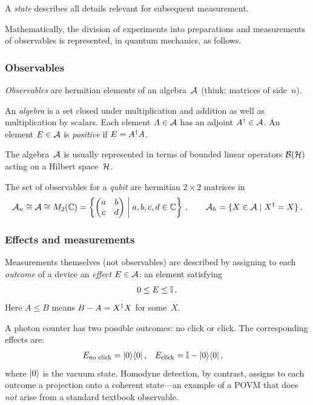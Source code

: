 \begin{keyresult}[State]
  A \emph{state} describes all details relevant for subsequent
  measurement.
\end{keyresult}

Mathematically, the division of experiments into preparations and
measurements of observables is represented, in quantum mechanics, as
follows.

\subsubsection{Observables}
\emph{Observables} are hermitian elements of an algebra~$\mathcal{A}$ (think:
matrices of side~$n$).

An \emph{algebra} is a set closed under multiplication and addition as
well as multiplication by scalars.  Each element $A \in \mathcal{A}$ has an
adjoint $A^\dagger \in \mathcal{A}$.  An element $E \in \mathcal{A}$ is \emph{positive}
if $E = A^\dagger A$.

The algebra~$\mathcal{A}$ is usually represented in terms of bounded linear
operators $\mathcal{B}(\mathcal{H})$ acting on a Hilbert space~$\mathcal{H}$.

\begin{example}\label{ex:qubit-obs}
  The set of observables for a \emph{qubit} are hermitian $2\times 2$
  matrices in
  \[
    \mathcal{A}_n \cong \mathcal{A} \cong M_{2}(\mathbb{C})
    = \left\{
      \begin{pmatrix} a & b \\ c & d \end{pmatrix}
      \;\middle|\; a,b,c,d \in \mathbb{C}
    \right\}\,,
    \qquad
    \mathcal{A}_h = \{ X \in \mathcal{A} \mid X^\dagger = X \}\,.
  \]
\end{example}

\subsubsection{Effects and measurements}\label{sec:effects}
Measurements themselves (not observables) are described by assigning to
each \emph{outcome} of a device an \emph{effect} $E \in \mathcal{A}$: an
element satisfying
\begin{equation}\label{eq:effect}
  0 \leq E \leq \mathbb{I}\,.
\end{equation}
Here $A \leq B$ means $B - A = X^\dagger X$ for some~$X$.

\begin{example}\label{ex:photon-counter}
  A photon counter has two possible outcomes: no click or click.  The
  corresponding effects are:
  \begin{align}
    E_{\text{no click}} &= \lvert 0 \rangle\langle 0 \rvert\,,
    & E_{\text{click}} &= \mathbb{I} - \lvert 0 \rangle\langle 0 \rvert\,,
  \end{align}
  where $\lvert 0 \rangle$ is the vacuum state.  Homodyne detection, by
  contrast, assigns to each outcome a projection onto a coherent
  state---an example of a POVM that does \emph{not} arise from a
  standard textbook observable.
\end{example}

